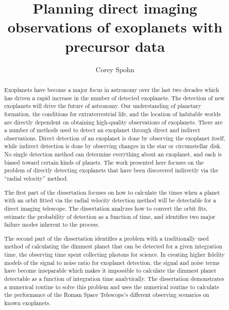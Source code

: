 \documentclass[phd,tocprelim]{cornell}
\title {Planning direct imaging observations of exoplanets with precursor data}
\author {Corey Spohn}
\begin{document}
\maketitle
\makecopyright

\begin{abstract}
Exoplanets have become a major focus in astronomy over the last two decades which has
driven a rapid increase in the number of detected exoplanets. The detection of new
exoplanets will drive the future of astronomy. Our understanding of planetary
formation, the conditions for extraterrestrial life, and the location of
habitable worlds are directly dependent on obtaining high-quality observations
of exoplanets. There are a number of methods used to detect an exoplanet
through direct and indirect observations. Direct detection of an exoplanet is
done by observing the exoplanet itself, while indirect detection is done by
observing changes in the star or circumstellar disk. No single detection method can determine
everything about an exoplanet, and each is biased toward certain kinds of
planets. The work presented here focuses on the problem of directly
detecting exoplanets that have been discovered indirectly 
via the ``radial velocity'' method.

The first part of the dissertation focuses on how to calculate the times when a
planet with an orbit fitted via the radial velocity detection method will be
detectable for a direct imaging telescope. The dissertation analyzes how to convert the orbit
fits, estimate the probability of detection as a function of time, and identifies
two major failure modes inherent to the process.

The second part of the dissertation identifies a problem with a traditionally
used method of calculating the dimmest planet that can be detected for a given
integration time, the observing time spent collecting photons for science. In
creating higher fidelity models of the signal to noise ratio for exoplanet
detection, the signal and noise terms have become inseparable which makes it
impossible to calculate the dimmest planet detectable as a function of
integration time analytically. The dissertation demonstrates a numerical
routine to solve this problem and uses the numerical routine to calculate the
performance of the Roman Space Telescope's different observing scenarios on
known exoplanets.


\end{abstract}
\end{document}
